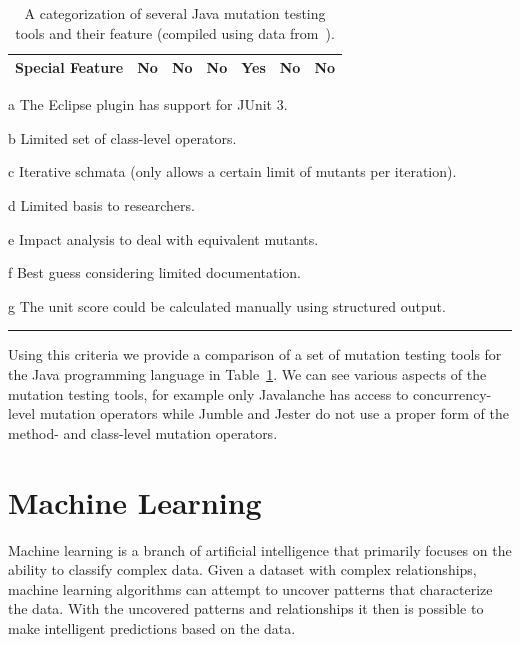 \begin{landscape}
\begin{table}[t!]
\begin{threeparttable}
\begin{tabular}{|l|l|l|l|l|l|l|}
        \hline \cellcolor[RGB]{169,196,223} \textbf{Special Feature} & No & No & No & Yes\tnote{e} & No & No \\
        \hline
      \end{tabular}
      \begin{tablenotes}
        \item[a] The Eclipse plugin has support for JUnit 3.
        \item[b] Limited set of class-level operators.
        \item[c] Iterative schmata (only allows a certain limit of mutants per iteration).
        \item[d] Limited basis to researchers.
        \item[e] Impact analysis to deal with equivalent mutants.
        \item[f] Best guess considering limited documentation.
        \item[g] The unit score could be calculated manually using structured output.
      \end{tablenotes}
    \end{threeparttable}
    \caption{A categorization of several Java mutation testing tools and their feature (compiled using data from~\cite{PIT, MR10}).}
    \vspace{2mm}
    \hrule
    \label{tab:mutation_tools}
  \end{table}
\end{landscape}

Using this criteria we provide a comparison of a set of mutation testing tools for the Java programming language in Table~\ref{tab:mutation_tools}. We can see various aspects of the mutation testing tools, for example only Javalanche has access to concurrency-level mutation operators while Jumble and Jester do not use a proper form of the method- and class-level mutation operators.


\section{Machine Learning}
\label{sec:background_machine_learning}
Machine learning is a branch of artificial intelligence that primarily focuses on the ability to classify complex data. Given a dataset with complex relationships, machine learning algorithms can attempt to uncover patterns that characterize the data. With the uncovered patterns and relationships it then is possible to make intelligent predictions based on the data.


